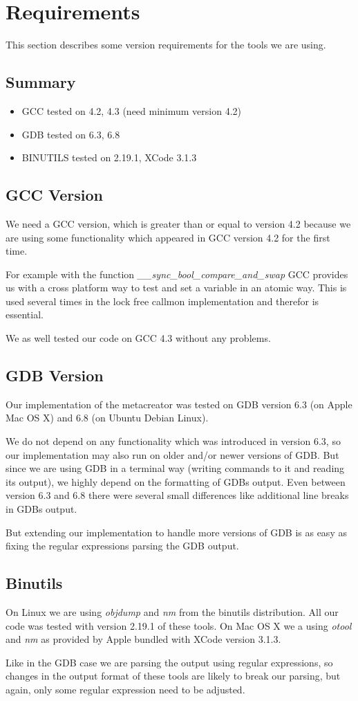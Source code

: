 
\section{Requirements} This section describes some version requirements for the tools we are using. 

\subsection{Summary}
\begin{itemize}
	\item GCC tested on 4.2, 4.3 (need minimum version 4.2)
	\item GDB tested on 6.3, 6.8
	\item BINUTILS tested on 2.19.1, XCode 3.1.3
\end{itemize}

\subsection{GCC Version} We need a GCC version, which is greater than or equal to version 4.2 because we are using some functionality which appeared in GCC version 4.2 for the first time.

For example with the function \emph{\_\_sync\_bool\_compare\_and\_swap} GCC provides us with a cross platform way to test and set a variable in an atomic way. This is used several times in the lock free callmon implementation and therefor is essential.

We as well tested our code on GCC 4.3 without any problems.

\subsection{GDB Version} Our implementation of the metacreator was tested on GDB version 6.3 (on Apple Mac OS X) and 6.8 (on Ubuntu Debian Linux).

We do not depend on any functionality which was introduced in version 6.3, so our implementation may also run on older and/or newer versions of GDB. But since we are using GDB in a terminal way (writing commands to it and reading its output), we highly depend on the formatting of GDBs output. Even between version 6.3 and 6.8 there were several small differences like additional line breaks in GDBs output.

But extending our implementation to handle more versions of GDB is as easy as fixing the regular expressions parsing the GDB output.

\subsection{Binutils} On Linux we are using \emph{objdump} and \emph{nm} from the binutils distribution. All our code was tested with version 2.19.1 of these tools. On Mac OS X we a using \emph{otool} and \emph{nm} as provided by Apple bundled with XCode version 3.1.3.

Like in the GDB case we are parsing the output using regular expressions, so changes in the output format of these tools are likely to break our parsing, but again, only some regular expression need to be adjusted.
